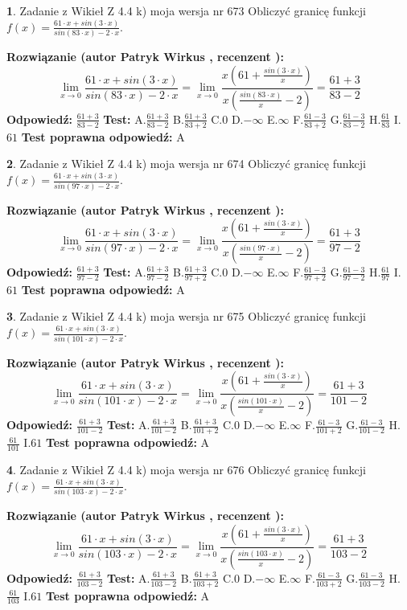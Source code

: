 \documentclass[12pt, a4paper]{article}
\theoremstyle{definition} %
\newtheorem{zad}{}
\newcommand{\zadStart}[1]{\begin{zad}#1\newline}
\newcommand{\zadStop}{\end{zad}}
\newcommand{\rozwStart}[2]{\noindent \textbf{Rozwiązanie (autor #1 , recenzent #2): }\newline}
\newcommand{\rozwStop}{\newline}
\newcommand{\odpStart}{\noindent \textbf{Odpowiedź:}\newline}
\newcommand{\odpStop}{\newline}
\newcommand{\testStart}{\noindent \textbf{Test:}\newline}
\newcommand{\testStop}{\newline}
\newcommand{\kluczStart}{\noindent \textbf{Test poprawna odpowiedź:}\newline}
\newcommand{\kluczStop}{\newline}
\begin{document}
\zadStart{Zadanie z Wikieł Z 4.4 k) moja wersja nr 673}
Obliczyć granicę funkcji $f(x)=\frac{61\cdot x +sin(3\cdot x)}{sin(83\cdot x) -2\cdot x}$.
\zadStop
\rozwStart{Patryk Wirkus}{}
$$\lim\limits_{x\to 0}\frac{61\cdot x +sin(3\cdot x)}{sin(83\cdot x) -2\cdot x}
=\lim\limits_{x\to 0}\frac{x(61+\frac{sin(3\cdot x)}{x})}{x(\frac{sin(83\cdot x)}{x}-2)}
=\frac{61+3}{83-2}$$
\rozwStop
\odpStart
$\frac{61+3}{83-2}$
\odpStop
\testStart
A.$\frac{61+3}{83-2}$
B.$\frac{61+3}{83+2}$
C.$0$
D.$-\infty$
E.$\infty$
F.$\frac{61-3}{83+2}$
G.$\frac{61-3}{83-2}$
H.$\frac{61}{83}$
I.$61$
\testStop
\kluczStart
A
\kluczStop



\zadStart{Zadanie z Wikieł Z 4.4 k) moja wersja nr 674}
Obliczyć granicę funkcji $f(x)=\frac{61\cdot x +sin(3\cdot x)}{sin(97\cdot x) -2\cdot x}$.
\zadStop
\rozwStart{Patryk Wirkus}{}
$$\lim\limits_{x\to 0}\frac{61\cdot x +sin(3\cdot x)}{sin(97\cdot x) -2\cdot x}
=\lim\limits_{x\to 0}\frac{x(61+\frac{sin(3\cdot x)}{x})}{x(\frac{sin(97\cdot x)}{x}-2)}
=\frac{61+3}{97-2}$$
\rozwStop
\odpStart
$\frac{61+3}{97-2}$
\odpStop
\testStart
A.$\frac{61+3}{97-2}$
B.$\frac{61+3}{97+2}$
C.$0$
D.$-\infty$
E.$\infty$
F.$\frac{61-3}{97+2}$
G.$\frac{61-3}{97-2}$
H.$\frac{61}{97}$
I.$61$
\testStop
\kluczStart
A
\kluczStop



\zadStart{Zadanie z Wikieł Z 4.4 k) moja wersja nr 675}
Obliczyć granicę funkcji $f(x)=\frac{61\cdot x +sin(3\cdot x)}{sin(101\cdot x) -2\cdot x}$.
\zadStop
\rozwStart{Patryk Wirkus}{}
$$\lim\limits_{x\to 0}\frac{61\cdot x +sin(3\cdot x)}{sin(101\cdot x) -2\cdot x}
=\lim\limits_{x\to 0}\frac{x(61+\frac{sin(3\cdot x)}{x})}{x(\frac{sin(101\cdot x)}{x}-2)}
=\frac{61+3}{101-2}$$
\rozwStop
\odpStart
$\frac{61+3}{101-2}$
\odpStop
\testStart
A.$\frac{61+3}{101-2}$
B.$\frac{61+3}{101+2}$
C.$0$
D.$-\infty$
E.$\infty$
F.$\frac{61-3}{101+2}$
G.$\frac{61-3}{101-2}$
H.$\frac{61}{101}$
I.$61$
\testStop
\kluczStart
A
\kluczStop



\zadStart{Zadanie z Wikieł Z 4.4 k) moja wersja nr 676}
Obliczyć granicę funkcji $f(x)=\frac{61\cdot x +sin(3\cdot x)}{sin(103\cdot x) -2\cdot x}$.
\zadStop
\rozwStart{Patryk Wirkus}{}
$$\lim\limits_{x\to 0}\frac{61\cdot x +sin(3\cdot x)}{sin(103\cdot x) -2\cdot x}
=\lim\limits_{x\to 0}\frac{x(61+\frac{sin(3\cdot x)}{x})}{x(\frac{sin(103\cdot x)}{x}-2)}
=\frac{61+3}{103-2}$$
\rozwStop
\odpStart
$\frac{61+3}{103-2}$
\odpStop
\testStart
A.$\frac{61+3}{103-2}$
B.$\frac{61+3}{103+2}$
C.$0$
D.$-\infty$
E.$\infty$
F.$\frac{61-3}{103+2}$
G.$\frac{61-3}{103-2}$
H.$\frac{61}{103}$
I.$61$
\testStop
\kluczStart
A
\kluczStop
\end{document}
